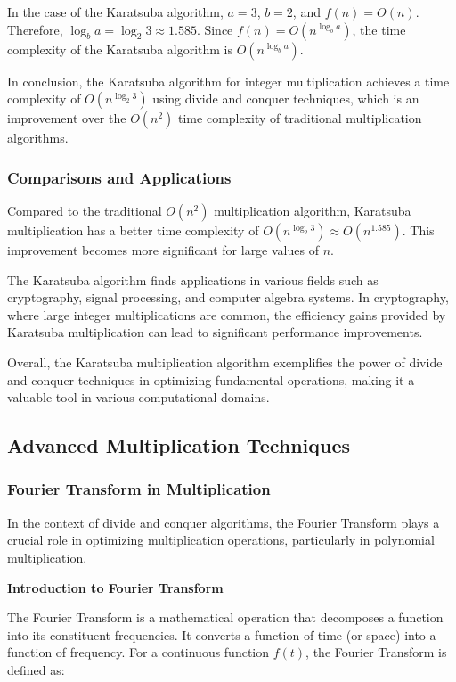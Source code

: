 \documentclass[12pt]{book} %
\begin{document}
In the case of the Karatsuba algorithm, \(a = 3\), \(b = 2\), and \(f(n) = O(n)\). Therefore, \(\log_b a = \log_2 3 \approx 1.585\). Since \(f(n) = O(n^{\log_b a})\), the time complexity of the Karatsuba algorithm is \(O(n^{\log_b a})\).

In conclusion, the Karatsuba algorithm for integer multiplication achieves a time complexity of \(O(n^{\log_2 3})\) using divide and conquer techniques, which is an improvement over the \(O(n^2)\) time complexity of traditional multiplication algorithms.

\subsubsection{Comparisons and Applications}
Compared to the traditional \(O(n^2)\) multiplication algorithm, Karatsuba multiplication has a better time complexity of \(O(n^{\log_2 3}) \approx O(n^{1.585})\). This improvement becomes more significant for large values of \(n\).

The Karatsuba algorithm finds applications in various fields such as cryptography, signal processing, and computer algebra systems. In cryptography, where large integer multiplications are common, the efficiency gains provided by Karatsuba multiplication can lead to significant performance improvements.

Overall, the Karatsuba multiplication algorithm exemplifies the power of divide and conquer techniques in optimizing fundamental operations, making it a valuable tool in various computational domains.

\subsection{Advanced Multiplication Techniques}

\subsubsection{Fourier Transform in Multiplication}
In the context of divide and conquer algorithms, the Fourier Transform plays a crucial role in optimizing multiplication operations, particularly in polynomial multiplication.

\textbf{Introduction to Fourier Transform}

The Fourier Transform is a mathematical operation that decomposes a function into its constituent frequencies. It converts a function of time (or space) into a function of frequency. For a continuous function \( f(t) \), the Fourier Transform is defined as:
\end{document}
